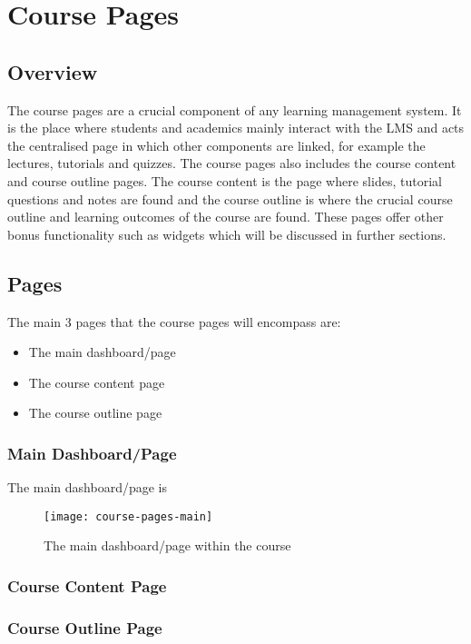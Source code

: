 \section{Course Pages}
\subsection{Overview}
The course pages are a crucial component of any learning management system. It is the place where students and academics mainly interact with the LMS and acts the centralised page in which other components are linked, for example the lectures, tutorials and quizzes. 
The course pages also includes the course content and course outline pages. The course content is the page where slides, tutorial questions and notes are found and the course outline is where the crucial course outline and learning outcomes of the course are found.
These pages offer other bonus functionality such as widgets which will be discussed in further sections.

\subsection{Pages}
The main 3 pages that the course pages will encompass are:
\begin{itemize}
    \item The main dashboard/page
    \item The course content page
    \item The course outline page
\end{itemize}

\subsubsection{Main Dashboard/Page}
The main dashboard/page is 
\begin{figure}[h]
    \centering
    \texttt{[image: course-pages-main]}
    \caption{The main dashboard/page within the course}
\end{figure}
\subsubsection{Course Content Page}
\subsubsection{Course Outline Page}